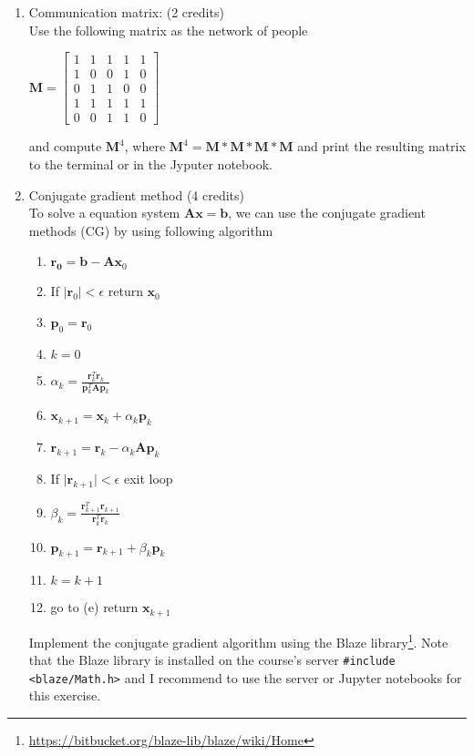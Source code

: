 \documentclass[11pt]{article}
\begin{document}
\begin{enumerate}

\item Communication matrix: (2 credits)\\
Use the following matrix as the network of people
\begin{center}
$
\mathbf{M} = \left[\begin{matrix}
1 & 1 & 1 & 1 & 1 \\
1 & 0 & 0 & 1 & 0 \\
0 & 1 & 1 & 0 & 0 \\
1 & 1 & 1 & 1 & 1 \\
0 & 0 & 1 & 1 & 0
\end{matrix}\right]
$
\end{center}
and compute $\mathbf{M}^4$, where $\mathbf{M}^4= \mathbf{M}*\mathbf{M}*\mathbf{M}*\mathbf{M}$ and print the resulting matrix to the terminal or in the Jyputer notebook. 

\item Conjugate gradient method (4 credits)\\
To solve a equation system $\mathbf{A}\mathbf{x}=\mathbf{b}$, we can use the conjugate gradient methods (CG) by using following algorithm
\begin{enumerate}
\item $\mathbf{r_0} = \mathbf{b} - \mathbf{A} \mathbf{x}_0$
\item If $\vert \mathbf{r}_0 \vert< \epsilon$ return  $\mathbf{x}_0$
\item $\mathbf{p}_0=\mathbf{r}_0$
\item $k=0$
\item $\alpha_k = \frac{\mathbf{r}_k^T\mathbf{r}_k}{\mathbf{p}_k^T\mathbf{A}\mathbf{p}_k}$
\item $ \mathbf{x}_{k+1} = \mathbf{x}_k + \alpha_k \mathbf{p}_k$
\item $ \mathbf{r}_{k+1} = \mathbf{r}_k - \alpha_k \mathbf{A} \mathbf{p}_k$
\item If $\vert \mathbf{r}_{k+1} \vert < \epsilon$ exit loop
\item $\beta_k = \frac{\mathbf{r}_{k+1}^T\mathbf{r}_{k+1}}{\mathbf{r}_k^T\mathbf{r}_k}$
\item $\mathbf{p}_{k+1}=\mathbf{r}_{k+1} + \beta_k \mathbf{p}_k$
\item $k=k+1$
\item go to (e)
return $\mathbf{x}_{k+1}$
\end{enumerate}
Implement the conjugate gradient algorithm using the Blaze library\footnote{\url{https://bitbucket.org/blaze-lib/blaze/wiki/Home}}. Note that the Blaze library is installed on the course's server \lstinline|#include <blaze/Math.h>| and I recommend to use the server or Jupyter notebooks for this exercise.


\end{enumerate}
\end{document}
